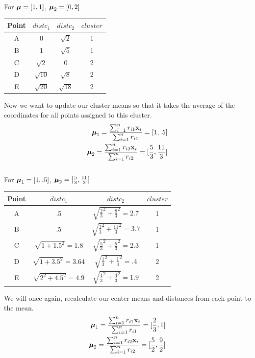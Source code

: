 \documentclass[12pt,letterpaper]{article}
\begin{document}
\begin{enumerate}
\begin{solution}
For $\boldsymbol{\mu} = [1,1]$, $\boldsymbol{\mu}_2 = [0,2]$
\begin{center}
\begin{tabular}{ |c|c|c|c| } 
 \hline
 Point & $distc_1$ & $distc_2$  & $cluster$ \\ 
 \hline 
 A & 0 & $\sqrt{2}$ & 1 \\ 
 B & 1 & $\sqrt{5}$ & 1\\ 
 C & $\sqrt{2}$ & 0 & 2 \\ 
 D & $\sqrt{10}$ & $\sqrt{8}$ & 2\\
 E & $\sqrt{20}$ & $\sqrt{18}$ & 2\\  
 \hline
\end{tabular}
\end{center}
Now we want to update our cluster means so that it takes the average of the coordinates for all points assigned to this cluster. 
\begin{align*}
	\boldsymbol{\mu}_1= \frac{\sum_{i=1}^n r_{i1}\textbf{x}_i}{\sum_{i=1}^{n}r_{i1}} = [1, .5]\\
	\boldsymbol{\mu}_2= \frac{\sum_{i=1}^n r_{i2}\textbf{x}_i}{\sum_{i=1}^{n}r_{i2}} = [\frac{5}{3},\frac{11}{3}]\\
\end{align*}
\\
For $\boldsymbol{\mu}_1 = [1,.5]$, $\boldsymbol{\mu}_2 = [\frac{5}{3},\frac{11}{3}]$
\begin{center}
\begin{tabular}{ |c|c|c|c| } 
 \hline
 Point & $distc_1$ & $distc_2$  & $cluster$ \\ 
 \hline 
 A & .5 & $\sqrt{\frac{2}{3}^2 + \frac{8}{3}^2} = 2.7$ & 1\\ 
 B & .5  & $\sqrt{\frac{2}{3}^2 + \frac{11}{3}^2} = 3.7$ & 1\\ 
 C & $\sqrt{1+1.5^2} = 1.8$ & $\sqrt{\frac{5}{3}^2 + \frac{5}{3}^2} = 2.3$ & 1 \\ 
 D & $\sqrt{1+3.5^2} = 3.64$ & $\sqrt{\frac{1}{3}^2 + \frac{1}{3}^2} = .4$ & 2\\
 E & $\sqrt{2^2+4.5^2} = 4.9$ & $\sqrt{\frac{4}{3}^2 + \frac{4}{3}^2} = 1.9$ & 2\\  
 \hline
\end{tabular}
\end{center}
We will once again, recalculate our center means and distances from each point to the mean.
\begin{align*}
	\bmu_1= \frac{\sum_{i=1}^n r_{i1}\textbf{x}_i}{\sum_{i=1}^{n}r_{i1}} = [\frac{2}{3}, 1]\\
	\bmu_2= \frac{\sum_{i=1}^n r_{i2}\textbf{x}_i}{\sum_{i=1}^{n}r_{i2}} = [\frac{5}{2},\frac{9}{2}]\\

\end{align*}
\end{solution}
\end{enumerate}
\end{document}
